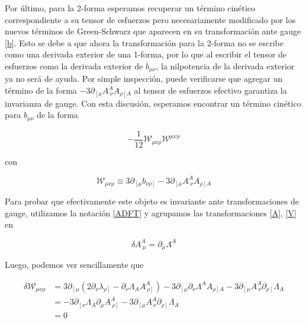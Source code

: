 \documentclass{article}
\numberwithin{equation}{section}
\begin{document}
Por último, para la 2-forma esperamos recuperar un término cinético correspondiente a su tensor de esfuerzos pero necesariamente modificado por los nuevos términos de Green-Schwarz que aparecen en su transformación ante gauge \ref{b}. Esto se debe a que ahora la transformación para la 2-forma no se escribe como una derivada exterior de una 1-forma, por lo que al escribir el tensor de esfuerzos como la derivada exterior de $ b_{\mu \nu} $, la nilpotencia de la derivada exterior ya no será de ayuda. Por simple inspección, puede verificarse que agregar un término de la forma $ -3\partial_{\left[\mu\right.}A^A_{\ \nu}A_{\left.\rho\right] A} $ al tensor de esfuerzos efectivo garantiza la invarianza de gauge. Con esta discusión, esperamos encontrar un término cinético para $ b_{\mu \nu} $ de la forma

\begin{equation}
- \frac{1}{12} \mathcal{W}_{\mu \nu \rho} \mathcal{W}^{\mu \nu \rho}
\end{equation}

con

\begin{equation}\label{W}
\mathcal{W}_{\mu \nu \rho} \equiv 3\partial_{\left[\mu\right.} b_{\left.\nu \rho\right]} - 3\partial_{\left[\mu\right.}A^A_{\ \nu}A_{\left.\rho\right] A}
\end{equation}

Para probar que efectivamente este objeto es invariante ante transformaciones de gauge, utilizamos la notación \ref{ADFT} y agrupamos las transformaciones \ref{A}, \ref{V} en

\begin{equation}
\delta A^{A}_{\ \mu} = \partial_{\mu} \Lambda^A
\end{equation} 

Luego, podemos ver sencillamente que

\begin{equation}
\begin{aligned}
\delta \mathcal{W}_{\mu \nu \rho} &= 3\partial_{\left[\mu\right.} \left( 2\partial_{\nu} \lambda_{\left. \rho\right]} - \partial_{\nu} \Lambda_A A^A_{\ \left. \rho\right]}\right) - 3\partial_{\left[\mu\right.}\partial_{\nu} \Lambda^A A_{\left.\rho\right] A} - 3\partial_{\left[\mu\right.} A^A_{\ \nu} \partial_{\left.\rho\right]} \Lambda_A\\
&= - 3 \partial_{\left[\nu\right.} \Lambda_A \partial_{\mu} A^A_{\ \left. \rho\right]} - 3\partial_{\left[\mu\right.} A^A_{\ \nu} \partial_{\left.\rho\right]} \Lambda_A\\
&= 0
\end{aligned}
\end{equation}
\end{document}
